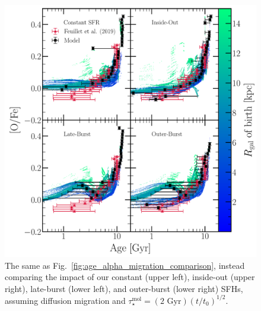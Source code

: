 \documentclass[a4paper, fleqn, usenatbib, useAMS]{mnras}
\begin{document}
\begin{figure} 
\centering 
\includegraphics[scale = 0.5]{age_ofe_sfh_comparison.pdf} 
\caption{The same as Fig.~\ref{fig:age_alpha_migration_comparison}, instead 
comparing the impact of our constant (upper left), inside-out (upper right), 
late-burst (lower left), and outer-burst (lower right) SFHs, assuming diffusion 
migration and $\tau_\star^\text{mol} = (\text{2 Gyr})(t/t_0)^{1/2}$. }
\label{fig:age_alpha_sfh_comparison} 
\end{figure} 
\end{document}
